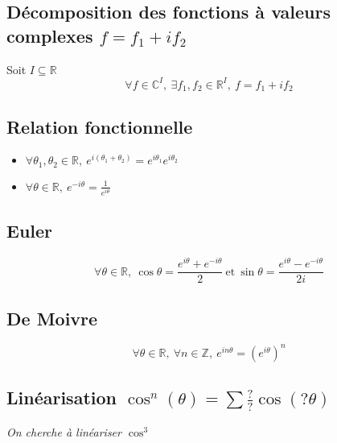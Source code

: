\documentclass{article}
\newcommand{\R}{{\mathbb R}}
\renewcommand{\C}{{\mathbb C}}
\newcommand{\Z}{{\mathbb Z}}
\begin{document}
\subsection{Décomposition des fonctions à valeurs complexes $f = f_1+if_2$}
Soit $I \subseteq \R$
\[
	\forall f\in \C^I,\ \exists f_1, f_2 \in \R^I,\ f = f_1+if_2
\] 

\subsection{Relation fonctionnelle}

\begin{itemize}
	\item $\forall \theta_1, \theta_2 \in \R,\ e^{i(\theta_1+\theta_2)} = e^{i\theta_1} e^{i\theta_2}$
	\item $\forall \theta\in \R,\ e^{-i\theta} = \frac{1}{e^{i\theta}}$
\end{itemize}

\subsection{Euler}

\[
	\forall \theta\in \R,\ \cos\theta = \frac{e^{i\theta}+e^{-i\theta}}{2}\ \text{et}\ \sin\theta = \frac{e^{i\theta}-e^{-i\theta}}{2i}
\] 


\subsection{De Moivre}
\[
	\forall \theta\in \R,\ \forall n \in \Z,\ e^{in\theta} = (e^{i\theta})^n
\] 

\subsection{Linéarisation $\cos^n(\theta) = \sum \frac{?}{?} \cos(?\theta)$}

\emph{On cherche à linéariser $\cos^3$} 
\end{document}
